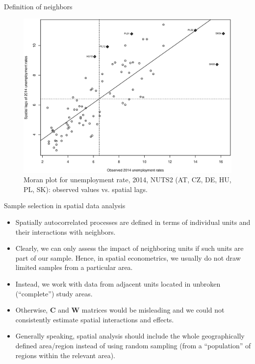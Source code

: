 \documentclass{beamer}
\begin{document}
\begin{frame}{Definition of neighbors}
\vspace{-0.3cm}
\begin{figure}
	\includegraphics[width=.7\textwidth]{IMG/sp_MoranPlot.eps}
	\caption[]{Moran plot for unemployment rate, 2014, NUTS2 (AT, CZ, DE, HU, PL, SK): observed values vs. spatial lags.}
\end{figure}
\end{frame}
\begin{frame}{Sample selection in spatial data analysis}
\begin{itemize}
    \item Spatially autocorrelated processes are defined in terms of individual units and their interactions with neighbors. 
    \smallskip
    \item Clearly, we can only assess the impact of neighboring units if such units are part of our sample. Hence, in spatial econometrics, we usually do not draw limited samples from a particular area.
    \smallskip
    \item Instead, we work with data from adjacent units located in unbroken (``complete'') study areas.  
    \smallskip
    \item Otherwise, $\bm{C}$ and $\bm{W}$ matrices would be misleading and we could not consistently estimate spatial interactions and effects.
    \smallskip    
    \item Generally speaking, spatial analysis should include the whole geographically defined area/region instead of using random sampling (from a ``population'' of regions within the relevant area). 
\end{itemize}
\end{frame}
\end{document}
